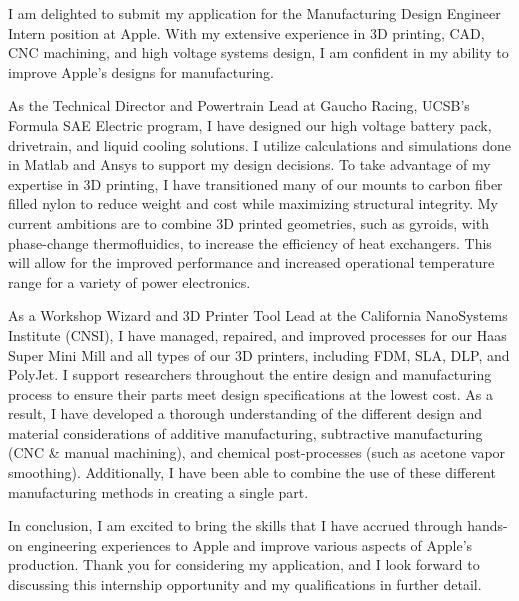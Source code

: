 \documentclass[11pt, letterpaper]{awesome-cv} %
\begin{document}
\makecvheader %

\makelettertitle %


\begin{cvletter}


I am delighted to submit my application for the Manufacturing Design Engineer Intern position at Apple. With my extensive experience in 3D printing, CAD, CNC machining, and high voltage systems design, I am confident in my ability to improve Apple's designs for manufacturing.

As the Technical Director and Powertrain Lead at Gaucho Racing, UCSB's Formula SAE Electric program, I have designed our high voltage battery pack, drivetrain, and liquid cooling solutions. I utilize calculations and simulations done in Matlab and Ansys to support my design decisions. To take advantage of my expertise in 3D printing, I have transitioned many of our mounts to carbon fiber filled nylon to reduce weight and cost while maximizing structural integrity. My current ambitions are to combine 3D printed geometries, such as gyroids, with phase-change thermofluidics, to increase the efficiency of heat exchangers. This will allow for the improved performance and increased operational temperature range for a variety of power electronics.

As a Workshop Wizard and 3D Printer Tool Lead at the California NanoSystems Institute (CNSI), I have managed, repaired, and improved processes for our Haas Super Mini Mill and all types of our 3D printers, including FDM, SLA, DLP, and PolyJet. I support researchers throughout the entire design and manufacturing process to ensure their parts meet design specifications at the lowest cost. As a result, I have developed a thorough understanding of the different design and material considerations of additive manufacturing, subtractive manufacturing (CNC \& manual machining), and chemical post-processes (such as acetone vapor smoothing). Additionally, I have been able to combine the use of these different manufacturing methods in creating a single part.

In conclusion, I am excited to bring the skills that I have accrued through hands-on engineering experiences to Apple and improve various aspects of Apple's production. Thank you for considering my application, and I look forward to discussing this internship opportunity and my qualifications in further detail.


\end{cvletter}


\makeletterclosing %
\end{document}
